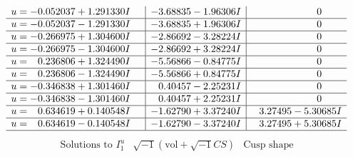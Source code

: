 \documentclass[1p]{elsarticle_modified}
\theoremstyle{definition}
\newcommand{\I}{\sqrt{-1}}
\begin{document}
$$\begin{array}{c|c|c}
\begin{aligned}
u &= -0.052037 + 1.291330 I\end{aligned}
 & -3.68835 - 1.96306 I & \phantom{-0.000000 } 0 \\ \hline\begin{aligned}
u &= -0.052037 - 1.291330 I\end{aligned}
 & -3.68835 + 1.96306 I & \phantom{-0.000000 } 0 \\ \hline\begin{aligned}
u &= -0.266975 + 1.304600 I\end{aligned}
 & -2.86692 - 3.28224 I & \phantom{-0.000000 } 0 \\ \hline\begin{aligned}
u &= -0.266975 - 1.304600 I\end{aligned}
 & -2.86692 + 3.28224 I & \phantom{-0.000000 } 0 \\ \hline\begin{aligned}
u &= \phantom{-}0.236806 + 1.324490 I\end{aligned}
 & -5.56866 - 0.84775 I & \phantom{-0.000000 } 0 \\ \hline\begin{aligned}
u &= \phantom{-}0.236806 - 1.324490 I\end{aligned}
 & -5.56866 + 0.84775 I & \phantom{-0.000000 } 0 \\ \hline\begin{aligned}
u &= -0.346838 + 1.301460 I\end{aligned}
 & \phantom{-}0.40457 - 2.25231 I & \phantom{-0.000000 } 0 \\ \hline\begin{aligned}
u &= -0.346838 - 1.301460 I\end{aligned}
 & \phantom{-}0.40457 + 2.25231 I & \phantom{-0.000000 } 0 \\ \hline\begin{aligned}
u &= \phantom{-}0.634619 + 0.140548 I\end{aligned}
 & -1.62790 + 3.37240 I & \phantom{-}3.27495 - 5.30685 I \\ \hline\begin{aligned}
u &= \phantom{-}0.634619 - 0.140548 I\end{aligned}
 & -1.62790 - 3.37240 I & \phantom{-}3.27495 + 5.30685 I\\
 \hline 
 \end{array}$$\newpage$$\begin{array}{c|c|c}  
\text{Solutions to }I^u_{1}& \I (\text{vol} + \sqrt{-1}CS) & \text{Cusp shape}\\

\end{array}$$
\end{document}
